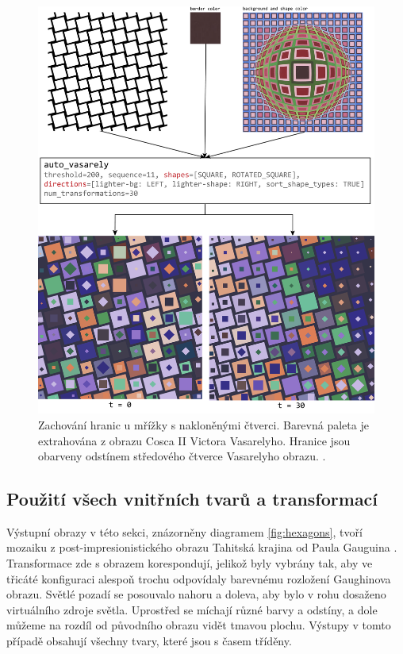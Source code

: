 \begin{figure}
    \centering
    \includegraphics[width=\textwidth]{obrazky-figures/tilted_squares.pdf}
    \caption{Zachování hranic u mřížky s nakloněnými čtverci. Barevná paleta je extrahována z obrazu Cosca II Victora Vasarelyho. Hranice jsou obarveny odstínem středového čtverce Vasarelyho obrazu. \cite{cosca2}. }
    \label{fig:tilted_squares}
\end{figure}

\subsection*{Použití všech vnitřních tvarů a transformací}

Výstupní obrazy v této sekci, znázorněny diagramem \ref{fig:hexagons}, tvoří mozaiku \linebreak z post-impresionistického obrazu Tahitská krajina od Paula Gauguina  \cite{tahiti}. Transformace zde s obrazem korespondují, jelikož byly vybrány tak, aby ve třicáté konfiguraci alespoň trochu odpovídaly barevnému rozložení Gaughinova obrazu. Světlé pozadí se posouvalo nahoru a doleva, aby bylo v rohu dosaženo virtuálního zdroje světla. Uprostřed se míchají různé barvy a odstíny, a dole můžeme na rozdíl od původního obrazu vidět tmavou plochu. Výstupy v tomto případě obsahují všechny tvary, které jsou s časem tříděny. 

